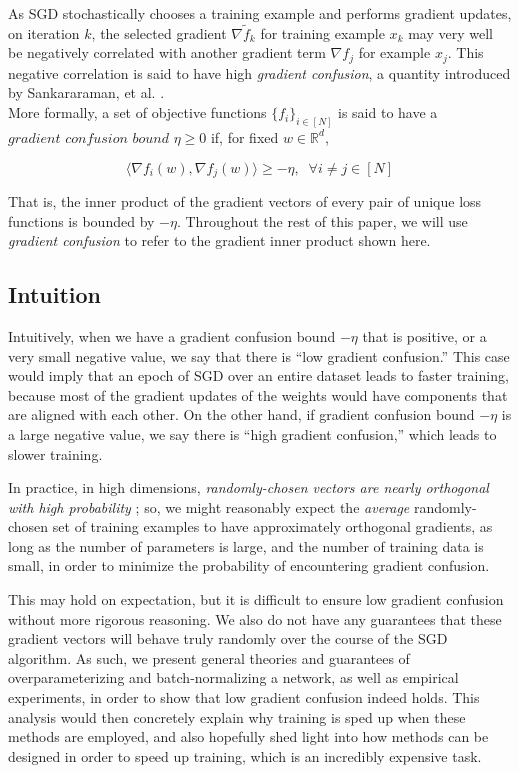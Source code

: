 \documentclass{article}
\begin{document}
As SGD stochastically chooses a training example and performs gradient updates, on iteration $k$, the selected gradient $\nabla \tilde{f}_k$ for training example $x_k$ may very well be negatively correlated with another gradient term $\nabla f_j$ for example $x_j$. This negative correlation is said to have high \textit{gradient confusion}, a quantity introduced by Sankararaman, et al. \cite{impact}. \\

More formally, a set of objective functions $\{f_i\}_{i \in [N]}$ is said to have a $\textit{gradient confusion bound}$ $\eta \geq 0$ if, for fixed $w \in \mathbb{R}^d$,

$$ \langle \nabla f_i(w), \nabla f_j(w) \rangle \geq -\eta, \;\; \forall i \not = j \in [N]$$

That is, the inner product of the gradient vectors of every pair of unique loss functions is bounded by $-\eta$. Throughout the rest of this paper, we will use \textit{gradient confusion} to refer to the gradient inner product shown here.

\subsection{Intuition}
Intuitively, when we have a gradient confusion bound $-\eta$ that is positive, or a very small negative value, we say that there is ``low gradient confusion.'' This case would imply that an epoch of SGD over an entire dataset leads to faster training, because most of the gradient updates of the weights would have components that are aligned with each other. On the other hand, if gradient confusion bound $-\eta$ is a large negative value, we say there is ``high gradient confusion,'' which leads to slower training.

In practice, in high dimensions, \textit{randomly-chosen vectors are nearly orthogonal with high probability} \cite{Milman}; so, we might reasonably expect the \textit{average} randomly-chosen set of training examples to have approximately orthogonal gradients, as long as the number of parameters is large, and the number of training data is small, in order to minimize the probability of encountering gradient confusion. 

This may hold on expectation, but it is difficult to ensure low gradient confusion without more rigorous reasoning. We also do not have any guarantees that these gradient vectors will behave truly randomly over the course of the SGD algorithm. As such, we present general theories and guarantees of overparameterizing and batch-normalizing a network, as well as empirical experiments, in order to show that low gradient confusion indeed holds. This analysis would then concretely explain why training is sped up when these methods are employed, and also hopefully shed light into how methods can be designed in order to speed up training, which is an incredibly expensive task.
\end{document}
